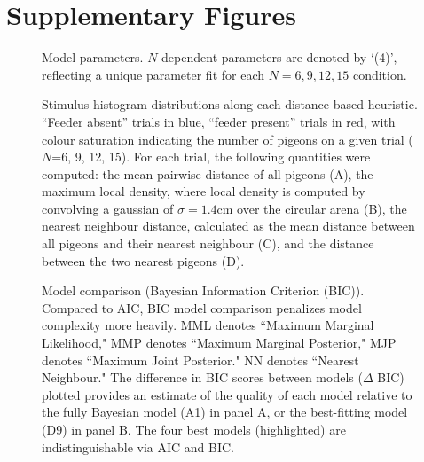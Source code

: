 \documentclass{article}
\begin{document}
\section*{Supplementary Figures}
\thispagestyle{empty}
\setcounter{page}{0}

\setcounter{figure}{0}
\makeatletter 
\renewcommand{\thefigure}{S\@arabic\c@figure}
\makeatother
\begin{figure}[ht]
\begin{center}
   \caption[List of models and model parameters]{Model parameters. $N$-dependent parameters are denoted by `(4)', reflecting a unique parameter fit for each $N = 6, 9, 12, 15$ condition.} 
   \label{fig:model_accounting}
\end{center}
\end{figure}

\begin{figure}[ht]
\begin{center}
   \caption[Stimulus histogram distributions along each distance-based heuristic]{Stimulus histogram distributions along each distance-based heuristic. ``Feeder absent'' trials in blue, ``feeder present'' trials in red, with colour saturation indicating the number of pigeons on a given trial ($N$=6, 9, 12, 15). For each trial, the following quantities were computed: the mean pairwise distance of all pigeons (A), the maximum local density, where local density is computed by convolving a gaussian of $\sigma=1.4$cm over the circular arena (B), the nearest neighbour distance, calculated as the mean distance between all pigeons and their nearest neighbour (C), and the distance between the two nearest pigeons (D).}
   \label{fig:summ_stats_hist}
\end{center}
\end{figure}


\begin{figure}[ht]
\begin{center}
   \caption[Model comparison (Bayesian Information Criterion (BIC))]{Model comparison (Bayesian Information Criterion (BIC)). Compared to AIC, BIC model comparison penalizes model complexity more heavily. MML denotes ``Maximum Marginal Likelihood," MMP denotes ``Maximum Marginal Posterior," MJP denotes ``Maximum Joint Posterior." NN denotes ``Nearest Neighbour." The difference in BIC scores between models ($\Delta$ BIC) plotted provides an estimate of the quality of each model relative to the fully Bayesian model (A1) in panel A, or the best-fitting model (D9) in panel B. The four best models (highlighted) are indistinguishable via AIC and BIC.}
   \label{fig:NLL_BIC}
\end{center}
\end{figure}
\end{document}

